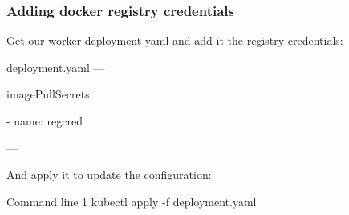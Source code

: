 	\begin{frame}
		\frametitle{Adding docker registry credentials}
		
		Get our worker deployment yaml and add it the registry credentials:
		\begin{block}{deployment.yaml}
			---
			
				imagePullSecrets:
				
				- name: regcred
				
			---
		\end{block}
		
		\bigskip
		And apply it to update the configuration:
		\begin{block}{Command line 1}
			kubectl apply -f deployment.yaml
		\end{block}
	\end{frame}
